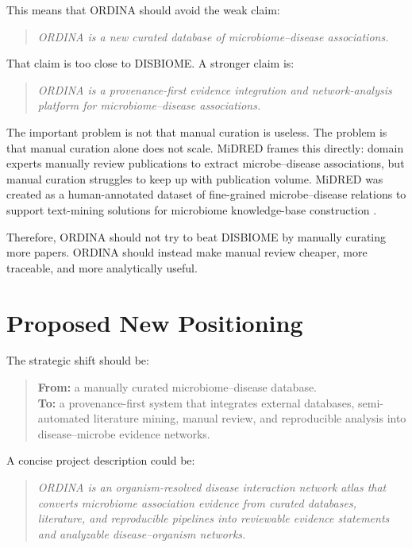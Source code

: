 \documentclass[11pt,a4paper]{article}
\begin{document}
This means that ORDINA should avoid the weak claim:

\begin{quote}
\emph{ORDINA is a new curated database of microbiome--disease associations.}
\end{quote}

That claim is too close to DISBIOME. A stronger claim is:

\begin{quote}
\emph{ORDINA is a provenance-first evidence integration and network-analysis platform for microbiome--disease associations.}
\end{quote}

The important problem is not that manual curation is useless. The problem is that manual curation alone does not scale. MiDRED frames this directly: domain experts manually review publications to extract microbe--disease associations, but manual curation struggles to keep up with publication volume. MiDRED was created as a human-annotated dataset of fine-grained microbe--disease relations to support text-mining solutions for microbiome knowledge-base construction \cite{midred}.

Therefore, ORDINA should not try to beat DISBIOME by manually curating more papers. ORDINA should instead make manual review cheaper, more traceable, and more analytically useful.

\section{Proposed New Positioning}

The strategic shift should be:

\begin{quote}
\textbf{From:} a manually curated microbiome--disease database.\\
\textbf{To:} a provenance-first system that integrates external databases, semi-automated literature mining, manual review, and reproducible analysis into disease--microbe evidence networks.
\end{quote}

A concise project description could be:

\begin{quote}
\emph{ORDINA is an organism-resolved disease interaction network atlas that converts microbiome association evidence from curated databases, literature, and reproducible pipelines into reviewable evidence statements and analyzable disease--organism networks.}
\end{quote}
\end{document}
